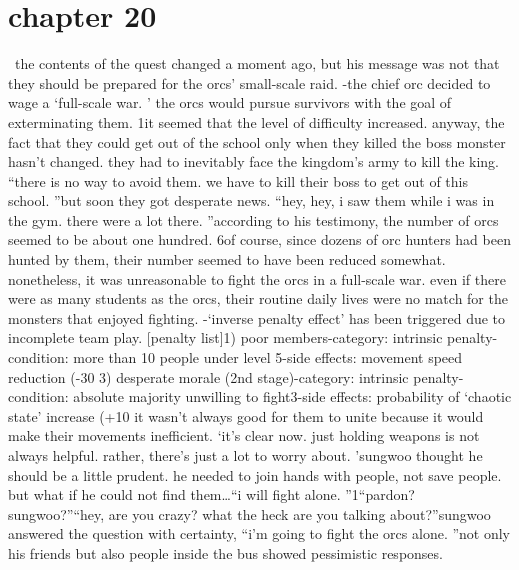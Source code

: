 \section{chapter 20}






 the contents of the quest changed a moment ago, but his message was not that they should be prepared for the orcs’ small-scale raid.
-the chief orc decided to wage a ‘full-scale war.
’ the orcs would pursue survivors with the goal of exterminating them.
1it seemed that the level of difficulty increased.
anyway, the fact that they could get out of the school only when they killed the boss monster hasn’t changed.
 they had to inevitably face the kingdom’s army to kill the king.
“there is no way to avoid them.
 we have to kill their boss to get out of this school.
”but soon they got desperate news.
“hey, hey, i saw them while i was in the gym.
 there were a lot there.
”according to his testimony, the number of orcs seemed to be about one hundred.
6of course, since dozens of orc hunters had been hunted by them, their number seemed to have been reduced somewhat.
nonetheless, it was unreasonable to fight the orcs in a full-scale war.
 even if there were as many students as the orcs, their routine daily lives were no match for the monsters that enjoyed fighting.
-‘inverse penalty effect’ has been triggered due to incomplete team play.
[penalty list]1) poor members-category: intrinsic penalty-condition: more than 10 people under level 5-side effects: movement speed reduction (-30%
3) desperate morale (2nd stage)-category: intrinsic penalty-condition: absolute majority unwilling to fight3-side effects: probability of ‘chaotic state’ increase (+10%
 it wasn’t always good for them to unite because it would make their movements inefficient.
‘it’s clear now.
 just holding weapons is not always helpful.
 rather, there’s just a lot to worry about.
’sungwoo thought he should be a little prudent.
 he needed to join hands with people, not save people.
 but what if he could not find them…“i will fight alone.
”1“pardon? sungwoo?”“hey, are you crazy? what the heck are you talking about?”sungwoo answered the question with certainty, “i’m going to fight the orcs alone.
”not only his friends but also people inside the bus showed pessimistic responses.
